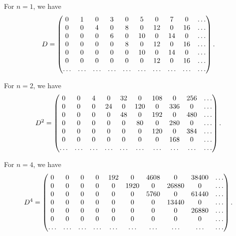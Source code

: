 For $ n = 1 $, we have
\begin{equation}
D = \begin{pmatrix}
    0 & 1 & 0 & 3 & 0 & 5 & 0 & 7 & 0 & \dots\\
    0 & 0 & 4 & 0 & 8 & 0 & 12 & 0 & 16 & \dots\\
    0 & 0 & 0 & 6 & 0 & 10 & 0 & 14 & 0 & \dots\\
    0 & 0 & 0 & 0 & 8 & 0 & 12 & 0 & 16 & \dots\\
    0 & 0 & 0 & 0 & 0 & 10 & 0 & 14 & 0 & \dots\\
    0 & 0 & 0 & 0 & 0 & 0 & 12 & 0 & 16 & \dots\\
    \dots & \dots & \dots & \dots & \dots & \dots & \dots & \dots & \dots & \dots 
\end{pmatrix}.
\label{D}
\end{equation}

For $ n = 2 $, we have
\begin{equation}
D^2 = \begin{pmatrix}
    0 & 0 & 4 & 0 & 32 & 0 & 108 & 0 & 256 & \dots\\
    0 & 0 & 0 & 24 & 0 & 120 & 0 & 336 & 0 & \dots \\
    0 & 0 & 0 & 0 & 48 & 0 & 192 & 0 & 480 & \dots \\
    0 & 0 & 0 & 0 & 0 & 80 & 0 & 280 & 0 & \dots\\
    0 & 0 & 0 & 0 & 0 & 0 & 120 & 0 & 384 & \dots\\
    0 & 0 & 0 & 0 & 0 & 0 & 0 & 168 & 0 & \dots\\
    \dots & \dots & \dots & \dots & \dots & \dots & \dots & \dots & \dots & \dots
\end{pmatrix}.
\label{D2}
\end{equation}

For $ n = 4 $, we have
\begin{equation}
    D^4 = \begin{pmatrix}
        0 & 0 & 0 & 0 & 192 & 0 & 4608 & 0 & 38400 & \dots\\
        0 & 0 & 0 & 0 & 0 & 1920 & 0 & 26880 & 0 & \dots\\
        0 & 0 & 0 & 0 & 0 & 0 & 5760 & 0 & 61440 & \dots\\
        0 & 0 & 0 & 0 & 0 & 0 & 0 & 13440 & 0 & \dots\\
        0 & 0 & 0 & 0 & 0 & 0 & 0 & 0 & 26880 & \dots\\
        0 & 0 & 0 & 0 & 0 & 0 & 0 & 0 & 0 & \dots\\
        \dots & \dots & \dots & \dots & \dots & \dots & \dots & \dots & \dots & \dots
    \end{pmatrix}.
    \label{D4}
\end{equation}

